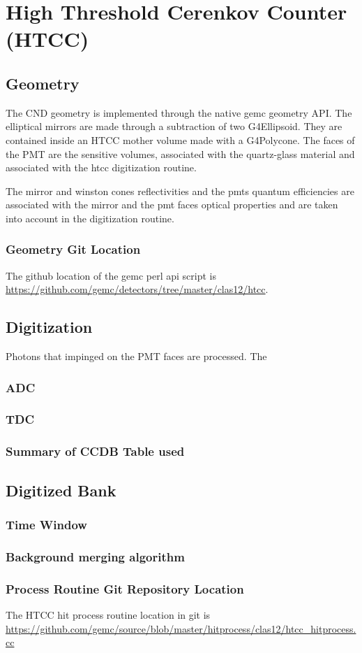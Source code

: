 \section{High Threshold Cerenkov Counter (HTCC)}

\subsection{Geometry}

The CND geometry is implemented through the native gemc geometry API. The elliptical mirrors are made through a subtraction of
two G4Ellipsoid. They are contained inside an HTCC mother volume made with a G4Polycone. The faces of the PMT are the sensitive volumes,
associated with the quartz-glass material and associated with the htcc digitization routine.

The mirror and winston cones reflectivities and the pmts quantum efficiencies are associated with the mirror and the pmt faces optical
properties and are taken into account in the digitization routine.



\subsubsection{Geometry Git Location}
The github location of the gemc perl api script is \url{https://github.com/gemc/detectors/tree/master/clas12/htcc}.



\subsection{Digitization}
Photons that impinged on the PMT faces are processed. The 

\subsubsection{ADC}
\subsubsection{TDC}



\subsubsection{Summary of CCDB Table used}

\subsection{Digitized Bank}

\subsubsection{Time Window}

\subsubsection{Background merging algorithm}

\subsubsection{Process Routine Git Repository Location}


The HTCC hit process routine location in git is \url{https://github.com/gemc/source/blob/master/hitprocess/clas12/htcc_hitprocess.cc}
